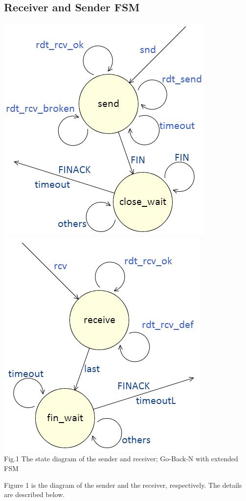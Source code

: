 \documentclass[10pt,a4paper]{article}
\begin{document}
\subsection{Receiver and Sender FSM}
    \begin{center}
        \includegraphics[scale=0.7]{fsmsnd.jpg}
        \; \; \;
        \includegraphics[scale=0.7]{fsmrcv.jpg}\\
        {\small Fig.1 \; The state diagram of the sender and receiver; Go-Back-N with extended FSM}
    \end{center}
    Figure 1 is the diagram of the sender and the receiver, respectively. The details are described below. 
\end{document}
